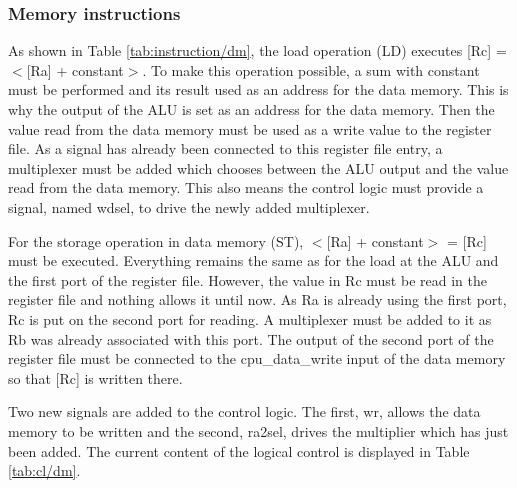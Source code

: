 \subsubsection*{Memory instructions}

As shown in Table \ref{tab:instruction/dm}, the load operation (LD) executes [Rc] = $<$[Ra] + constant$>$.
To make this operation possible, a sum with constant must be performed and its result used as an 
address for the data memory. This is why the output of the ALU is set as an address for the data 
memory. Then the value read from the data memory must be used as a write value to the register file. 
As a signal has already been connected to this register file entry, a multiplexer must be added 
which chooses between the ALU output and the value read from the data memory.  This also means the control logic must provide a signal, named wdsel, to drive the newly added multiplexer.

For the storage operation in data memory (ST), $<$[Ra] + constant$>$ = [Rc] must be executed.
Everything remains the same as for the load at the ALU and the first port of the register file. 
However, the value in Rc must be read in the register file and nothing allows it until now. As Ra is 
already using the first port, Rc is put on the second port for reading. A multiplexer must be added 
to it as Rb was already associated with this port. The output of the second port of the register 
file must be connected to the cpu\_data\_write input of the data memory so that [Rc] is written 
there. 

Two new signals are added to the control logic. The first, wr, allows the data memory to be written 
and the second, ra2sel, drives the multiplier which has just been added. The current content of the 
logical control is displayed in Table \ref{tab:cl/dm}.


